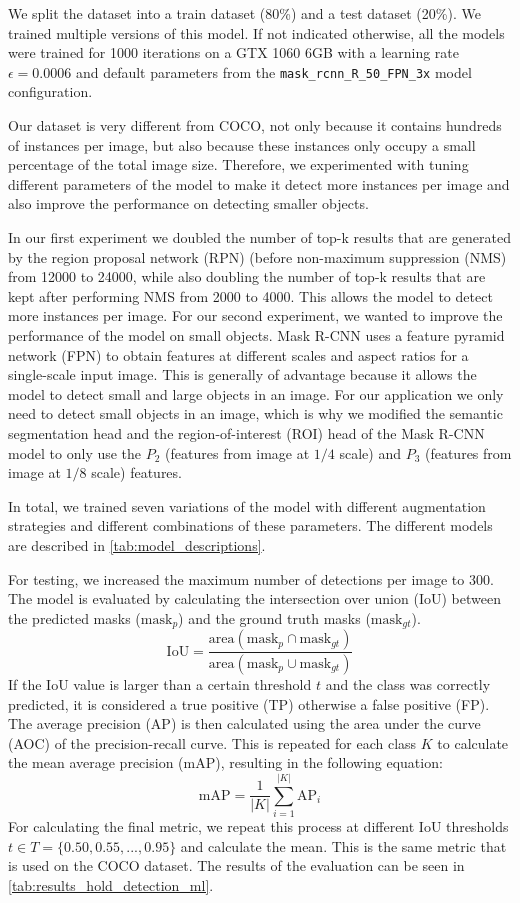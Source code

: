 \documentclass[final]{cvpr}
\begin{document}
We split the dataset into a train dataset (80\%) and a test dataset (20\%).
We trained multiple versions of this model. If not indicated otherwise, all the models were trained for 1000 iterations on a GTX 1060 6GB with a learning rate $\epsilon=0.0006$ and default parameters from the \texttt{mask\_rcnn\_R\_50\_FPN\_3x} model configuration.

Our dataset is very different from COCO, not only because it contains hundreds of instances per image, but also because these instances only occupy a small percentage of the total image size.
Therefore, we experimented with tuning different parameters of the model to make it detect more instances per image and also improve the performance on detecting smaller objects.

In our first experiment we doubled the number of top-k results that are generated by the region proposal network (RPN) (before non-maximum suppression (NMS) from 12000 to 24000, while also doubling the number of top-k results that are kept after performing NMS from 2000 to 4000. This allows the model to detect more instances per image.
For our second experiment, we wanted to improve the performance of the model on small objects. 
Mask R-CNN uses a feature pyramid network (FPN) \cite{FPN} to obtain features at different scales and aspect ratios for a single-scale input image.
This is generally of advantage because it allows the model to detect small and large objects in an image. For our application we only need to detect small objects in an image, which is why we modified the semantic segmentation head and the region-of-interest (ROI) head of the Mask R-CNN model to only use the $P_2$ (features from image at $1/4$ scale) and $P_3$ (features from image at $1/8$ scale) features.

In total, we trained seven variations of the model with different augmentation strategies and different combinations of these parameters. The different models are described in \autoref{tab:model_descriptions}.


For testing, we increased the maximum number of detections per image to 300.
The model is evaluated by calculating the intersection over union (IoU) between the predicted masks ($\text{mask}_{p}$) and the ground truth masks ($\text{mask}_{gt}$).
$$\mathrm{IoU} = \frac{\text{area}(\text{mask}_{p} \cap \text{mask}_{gt})}{\text{area}(\text{mask}_{p} \cup \text{mask}_{gt})}$$
If the IoU value is larger than a certain threshold $t$ and the class was correctly predicted, it is considered a true positive (TP) otherwise a false positive (FP).
The average precision (AP) is then calculated using the area under the curve (AOC) of the precision-recall curve.
This is repeated for each class $K$ to calculate the mean average precision (mAP), resulting in the following equation:
$$\mathrm{mAP} = \frac{1}{|K|} \sum_{i = 1}^{|K|} \mathrm{AP}_i$$
For calculating the final metric, we repeat this process at different IoU thresholds $t \in T=\{0.50, 0.55, ..., 0.95\}$ and calculate the mean.
This is the same metric that is used on the COCO \cite{coco} dataset.
The results of the evaluation can be seen in \autoref{tab:results_hold_detection_ml}.
\end{document}
